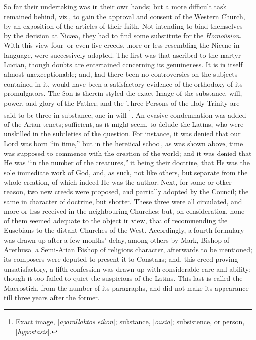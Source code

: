 So far their undertaking was in their own hands; but a more
difficult task remained behind, viz., to gain the approval and consent
of the Western Church, by an exposition of the articles of their
faith. Not intending to bind themselves by the decision at Nicæa,
they had to find some substitute for the \emph{Homoüsion}. With this
view four, or even five creeds, more or less resembling the Nicene in
language, were successively adopted. The first was that ascribed to
the martyr Lucian, though doubts are entertained concerning its
genuineness. It is in itself almost unexceptionable; and, had there
been no controversies on the subjects contained in it, would have been
a satisfactory evidence of the orthodoxy of its promulgators. The Son
is therein styled the exact Image of the substance, will, power, and
glory of the Father; and the Three Persons of the Holy Trinity
are said to be three in substance, one in will \footnote{Exact image, [\emph{aparallaktos eik\={o}n}];
substance, [\emph{ousia}]; subsistence, or person, [\emph{hypostasis}].}. An evasive condemnation was added of the Arian tenets;
sufficient, as it might seem, to delude the Latins, who were unskilled
in the subtleties of the question. For instance, it was denied that
our Lord was born ``in time,'' but in the heretical school, as
was shown above, time was supposed to commence with the creation of
the world; and it was denied that He was ``in the number of the
creatures,'' it being their doctrine, that He was the sole
immediate work of God, and, as such, not like others, but separate
from the whole creation, of which indeed He was the author. Next, for
some or other reason, two new creeds were proposed, and partially
adopted by the Council; the same in character of doctrine, but
shorter. These three were all circulated, and more or less received in
the neighbouring Churches; but, on consideration, none of them seemed
adequate to the object in view, that of recommending the Eusebians to
the distant Churches of the West. Accordingly, a fourth formulary was
drawn up after a few months' delay, among others by Mark, Bishop of
Arethusa, a Semi-Arian Bishop of religious character, afterwards to be
mentioned; its composers were deputed to present it to Constans; and,
this creed proving unsatisfactory, a fifth confession was drawn up
with considerable care and ability; though it too failed to quiet the
suspicions of the Latins. This last is called the Macrostich, from the
number of its paragraphs, and did not make its appearance till three
years after the former.

